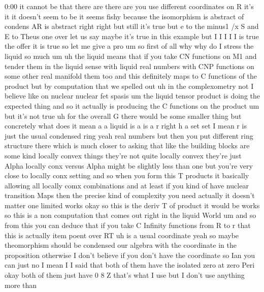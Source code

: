 \begin{unfinished}{0:00}
it  cannot  be  that  there
are  there  are  you  use  different
coordinates  on  R  it's  it  it  doesn't  seem
to  be  it  seems  fishy  because  the
isomorphism  is  abstract  of  condens  AR  is
abstract  right  right  but  still  it's
true  but  e  to  the  minus1  /x  S  and  E  to
Theus  one
over  let  us  say  maybe  it's  true  in  this
example  but  I  I  I  I  I  is  true  the  offer
it  is  true  so  let  me  give  a  pro
um  so  first  of
all  why  why  do  I  stress  the  liquid  so
much
um  uh  the  liquid  means  that  if  you  take
CN  functions  on  M1  and  tender  them  in
the  liquid
sense  with  liquid  real  numbers  with  CNP
functions  on  some  other  real  manifold
them  too  and  this  definitely  maps  to  C
functions  of  the
product  but  by  computation  that  we
spelled  out  uh  in  the  complexometry  not
I  believe  like  on
nuclear  nuclear  fet  spasis  um  the  liquid
tensor  product  is  doing  the  expected
thing  and  so  it  actually  is  producing
the  C  functions  on  the  product  um  but
it's  not
true  uh  for  the  overall
G  there  would  be  some  smaller
thing  but  concretely  what  does  it  mean  a
a  liquid  is  a  is  a  r
right
h  a  set  set  I  mean  r  is  just  the  usual
condensed  ring  yeah  real  numbers  but
then  you  put  different  ring  structure
there  which
is  much  closer  to  asking  that  like  the
building  blocks  are  some  kind  locally
convex  things  they're  not  quite  locally
convex  they're  just  Alpha  locally  conx
versus  Alpha  might  be  slightly  less  than
one  but  you're  very  close  to  locally
conx  setting  and  so  when  you  form  this  T
products  it  basically  allowing  all
locally  comx  combinations  and  at  least
if  you  kind  of  have  nuclear  transition
Maps  then  the
precise  kind  of  complexity  you  need
actually  it  doesn't  matter  one  limited
works  okay
so  this  is  the  deriv  T  of  product  it
would
be  works  so  this  is  a  non  computation
that  comes  out  right  in  the  liquid
World  um  and  so  from  this  you  can  deduce
that  if  you  take  C  Infinity  functions
from  R  to  r  that  this  is  actually  item
poent  over  RT
uh
is  a  usual  coordinate
yeah  so  maybe  theomorphism  should  be
condensed  our  algebra  with  the
coordinate  in  the  proposition  otherwise
I  don't  believe  if  you  don't  have  the
coordinate  so  Ian  you  can  just  no  I  mean
I  I  said  that  both  of  them  have  the
isolated  zero  at  zero  Peri  okay  both  of
them  just  have  0  8  Z  that's  what  I  use
but  I  don't  use  anything  more  than

\end{unfinished}
